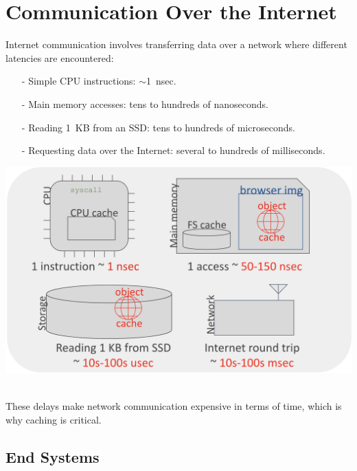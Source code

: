 \section{Communication Over the Internet}
Internet communication involves transferring data over a network where different latencies are encountered: \\
\begin{minipage}{0.45\textwidth}
  \begin{itemize}
    \item[-] Simple CPU instructions: \(\sim\)1~nsec.
    \item[-] Main memory accesses: tens to hundreds of nanoseconds.
    \item[-] Reading 1~KB from an SSD: tens to hundreds of microseconds.
    \item[-] Requesting data over the Internet: several to hundreds of milliseconds.
\end{itemize}
\end{minipage}
\hfill
\vline
\hfill
\begin{minipage}{0.45\textwidth}
\begin{center}
  \includegraphics[width=1.15\textwidth]{chapters/L1/images/internet.png}
\end{center}
\end{minipage}\\[5px]
These delays make network communication expensive in terms of time, which is why caching is critical.

\subsection{End Systems}

